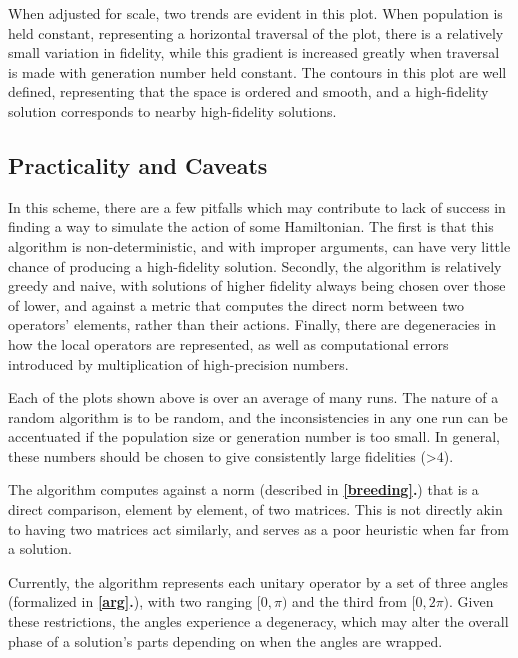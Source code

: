 \documentclass[11pt,twocolumn]{article}
\begin{document}
    When adjusted for scale, two trends are evident in this plot. When population is held constant, representing a horizontal traversal of the plot, there is a relatively small variation in fidelity, while this gradient is increased greatly when traversal is made with generation number held constant. The contours in this plot are well defined, representing that the space is ordered and smooth, and a high-fidelity solution corresponds to nearby high-fidelity solutions.  


	\subsection{Practicality and Caveats}

	In this scheme, there are a few pitfalls which may contribute to lack of success in finding a way to simulate the action of some Hamiltonian. The first is that this algorithm is non-deterministic, and with improper arguments, can have very little chance of producing a high-fidelity solution. Secondly, the algorithm is relatively greedy and naive, with solutions of higher fidelity always being chosen over those of lower, and against a metric that computes the direct norm between two operators' elements, rather than their actions. Finally, there are degeneracies in how the local operators are represented, as well as computational errors introduced by multiplication of high-precision numbers. 

	Each of the plots shown above is over an average of many runs. The nature of a random algorithm is to be random, and the inconsistencies in any one run can be accentuated if the population size or generation number is too small. In general, these numbers should be chosen to give consistently large fidelities (>$4$).

	The algorithm computes against a norm (described in \textbf{\ref{breeding}.}) that is a direct comparison, element by element, of two matrices. This is not directly akin to having two matrices act similarly, and serves as a poor heuristic when far from a solution. 

	Currently, the algorithm represents each unitary operator by a set of three angles (formalized in \textbf{\ref{arg}.}), with two ranging $[0, \pi)$ and the third from $[0, 2\pi)$. Given these restrictions, the angles experience a degeneracy, which may alter the overall phase of a solution's parts depending on when the angles are wrapped. 
\end{document}
